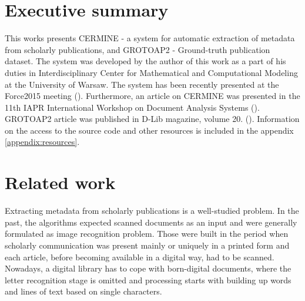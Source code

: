 \section{Executive summary}
This works presents CERMINE - a system for automatic extraction of metadata from scholarly publications, and GROTOAP2 - Ground-truth publication dataset. The system was developed by the author of this work as a part of his duties in Interdisciplinary Center for Mathematical and Computational Modeling at the University of Warsaw. The system has been recently presented at the Force2015 meeting (\cite{Force2015}). Furthermore, an article on CERMINE was presented in the 11th IAPR International Workshop on Document Analysis Systems (\cite{DominikaTkaczykPaweSzostekMateuszFedoryszakPiotrJanDendek2014}). GROTOAP2 article was published in D-Lib magazine, volume 20. (\cite{DominikaTkaczykPaweSzostek2014}).
Information on the access to the source code and other resources is included in the appendix \ref{appendix:resources}.
\section{Related work}
Extracting metadata from scholarly publications is a well-studied problem. In the past, the algorithms expected scanned documents as an input and were generally formulated as image recognition problem. Those were built in the period when scholarly communication was present mainly or uniquely in a printed form and each article, before becoming available in a digital way, had to be scanned.
Nowadays, a digital library has to cope with born-digital documents, where the letter recognition stage is omitted and processing starts with building up words and lines of text based on single characters.



